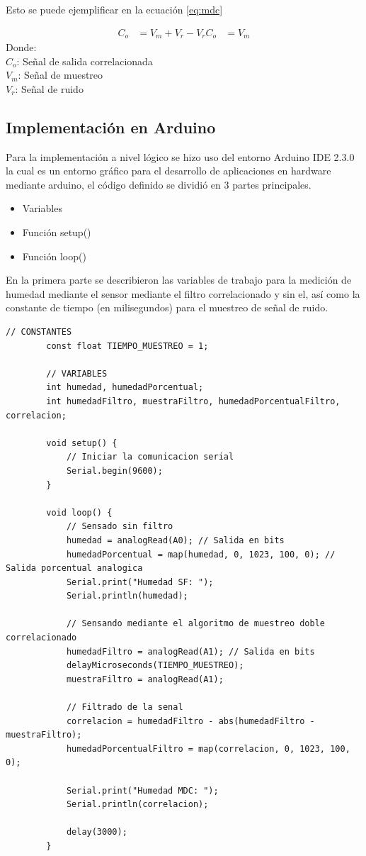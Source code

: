 \documentclass[conference]{IEEEtran}
\begin{document}
	Esto se puede ejemplificar en la ecuación \ref{eq:mdc}
	
	\begin{align}
		C_o &= V_m + V_r - V_r
		\label{eq:mdc}
		C_o &= V_m
	\end{align}
	Donde:\\
	$C_o$: Señal de salida correlacionada\\
	$V_m$: Señal de muestreo \\
	$V_r$: Señal de ruido\\
	
	\subsection{Implementación en Arduino}
	
	Para la implementación a nivel lógico se hizo uso del entorno Arduino IDE 2.3.0 la cual es un entorno gráfico para el desarrollo de aplicaciones en hardware mediante arduino, el código definido se dividió en 3 partes principales.
	
	\begin{itemize}
		\item Variables
		\item Función setup()
		\item Función loop()
	\end{itemize}
	
	En la primera parte se describieron las variables de trabajo para la medición de humedad mediante el sensor mediante el filtro correlacionado y sin el, así como la constante de tiempo (en milisegundos) para el muestreo de señal de ruido.
	
	\begin{lstlisting}[caption=Arduino Muestreo doble Correlacionado, numbers=none, label=cd:codigo-mdc]
		// CONSTANTES
		const float TIEMPO_MUESTREO = 1;
		
		// VARIABLES
		int humedad, humedadPorcentual;
		int humedadFiltro, muestraFiltro, humedadPorcentualFiltro, correlacion;
		
		void setup() {
			// Iniciar la comunicacion serial
			Serial.begin(9600);
		}
		
		void loop() {
			// Sensado sin filtro
			humedad = analogRead(A0); // Salida en bits
			humedadPorcentual = map(humedad, 0, 1023, 100, 0); // Salida porcentual analogica
			Serial.print("Humedad SF: ");
			Serial.println(humedad);
			
			// Sensando mediante el algoritmo de muestreo doble correlacionado
			humedadFiltro = analogRead(A1); // Salida en bits
			delayMicroseconds(TIEMPO_MUESTREO);
			muestraFiltro = analogRead(A1);
			
			// Filtrado de la senal
			correlacion = humedadFiltro - abs(humedadFiltro - muestraFiltro);
			humedadPorcentualFiltro = map(correlacion, 0, 1023, 100, 0);
			
			Serial.print("Humedad MDC: ");
			Serial.println(correlacion);
			
			delay(3000);
		}
	\end{lstlisting}
	 
\end{document}
